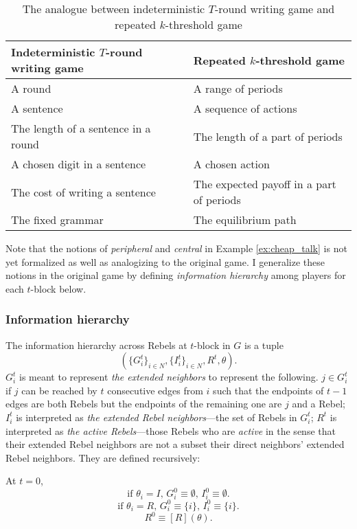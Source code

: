 \documentclass[12pt,letter]{article}
\theoremstyle{definition}
\theoremstyle{remark}
\theoremstyle{claim}
\begin{document}
\begin{table}[!htbp]
\caption{The analogue between indeterministic $T$-round writing game and repeated $k$-threshold game}
\label{table:analogue}
\begin{center}
\begin{tabular}{ll }
Indeterministic $T$-round writing game & Repeated $k$-threshold game \\
\hline
\hline
A round & A range of periods\\
A sentence & A sequence of actions \\
The length of a sentence in a round & The length of a part of periods\\
A chosen digit in a sentence & A chosen action\\
The cost of writing a sentence & The expected payoff in a part of periods\\
The fixed grammar & The equilibrium path\\
\hline
\end{tabular}
\end{center}

\end{table}



Note that the notions of \textit{peripheral} and \textit{central} in Example \ref{ex:cheap_talk} is not yet formalized as well as analogizing to the original game. I generalize these notions in the original game by defining \textit{information hierarchy} among players for each $t$-block below.
\subsubsection{Information hierarchy}
\label{sec:info}
The information hierarchy across Rebels  at $t$-block in $G$ is a tuple \[(\{G^{t}_i\}_{i\in N}, \{I^{t}_i\}_{i\in N}, R^t,\theta).\]
$G^{t}_i$ is meant to represent \textit{the extended neighbors} to represent the following. $j\in G^{t}_i$ if $j$ can be reached by $t$ consecutive edges from $i$ such that the endpoints of $t-1$ edges are both Rebels but the endpoints of the remaining one are $j$ and a Rebel; $I^{t}_i$ is interpreted as \textit{the extended Rebel neighbors}---the set of Rebels in $G^t_i$; $R^t$ is interpreted as \textit{the active Rebels}---those Rebels who are \textit{active} in the sense that their extended Rebel neighbors are not a subset their direct neighbors' extended Rebel neighbors. They are defined recursively: 

At $t=0$,
\[\text{if $\theta_i=I$, $G^{0}_i\equiv \emptyset$, $I^{0}_i\equiv \emptyset$.}\] 
\[\text{if $\theta_i=R$, $G^{0}_i\equiv \{i\}$, $I^{0}_i\equiv \{i\}$.}\] 
\[\text{$R^0\equiv [R](\theta)$.}\] 
\end{document}
